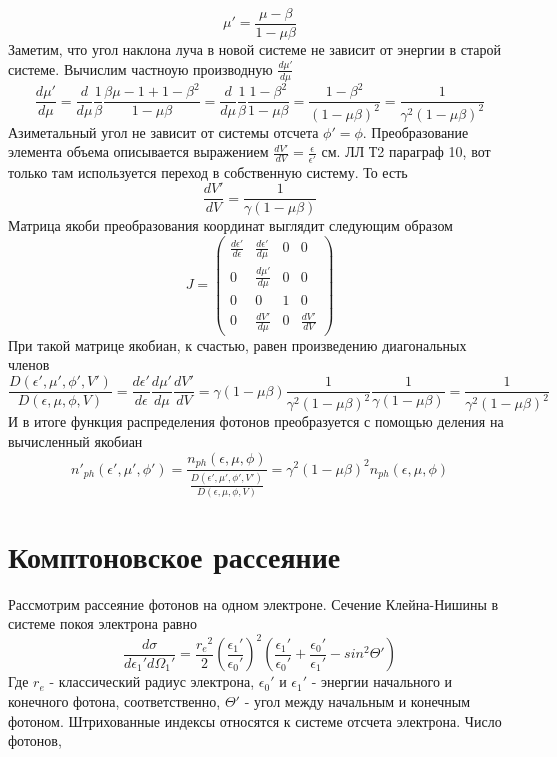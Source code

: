 \begin{equation}\label{aberration_ph}
	\mu'=\frac{\mu-\beta}{1-\mu\beta}
\end{equation}
Заметим, что угол наклона луча в новой системе не зависит от энергии в старой системе. Вычислим частноую производную $\frac{d\mu'}{d\mu}$
\begin{equation}
	\frac{d\mu'}{d\mu}=\frac{d}{d\mu}\frac{1}{\beta}\frac{\beta\mu-1+1-\beta^2}{1-\mu\beta}=\frac{d}{d\mu}\frac{1}{\beta}\frac{1-\beta^2}{1-\mu\beta}=\frac{1-\beta^2}{(1-\mu\beta)^2}=\frac{1}{\gamma^2(1-\mu\beta)^2}
\end{equation}
Азиметальный угол не зависит от системы отсчета $\phi' = \phi$. Преобразование элемента объема описывается выражением $\frac{dV'}{dV} = \frac{\epsilon}{\epsilon'}$ см. ЛЛ Т2 параграф 10, вот только там используется переход в собственную систему. То есть
\begin{equation}
	\frac{dV'}{dV} = \frac{1}{\gamma(1-\mu\beta)}
\end{equation}
Матрица якоби преобразования координат выглядит следующим образом
\begin{equation}
	J=\left(
	\begin{array}{cccc}
		\frac{d\epsilon'}{d\epsilon} & \frac{d\epsilon'}{d\mu}& 0 & 0\\
		0 & \frac{d\mu'}{d\mu} & 0 & 0\\
		0 & 0 & 1 & 0\\
		0 & \frac{dV'}{d\mu} & 0 & \frac{dV'}{dV}
	\end{array}
	\right)
\end{equation}
При такой матрице якобиан, к счастью, равен произведению диагональных членов
\begin{equation}\label{jacobian_ph}
	\frac{D(\epsilon',\mu',\phi',V')}{D(\epsilon,\mu,\phi,V)}=\frac{d\epsilon'}{d\epsilon}\frac{d\mu'}{d\mu}\frac{dV'}{dV}=\gamma(1-\mu\beta)\frac{1}{\gamma^2(1-\mu\beta)^2}\frac{1}{\gamma(1-\mu\beta)}=\frac{1}{\gamma^2(1-\mu\beta)^2}
\end{equation}
И в итоге функция распределения фотонов преобразуется с помощью деления на вычисленный якобиан
\begin{equation}\label{distribution_ph}
	n'_{ph}(\epsilon',\mu',\phi') = \frac{n_{ph}(\epsilon,\mu,\phi)}{\frac{D(\epsilon',\mu',\phi',V')}{D(\epsilon,\mu,\phi,V)}}=\gamma^2(1-\mu\beta)^2 n_{ph}(\epsilon,\mu,\phi)
\end{equation}
\section{Комптоновское рассеяние}
Рассмотрим рассеяние фотонов на одном электроне. Сечение Клейна-Нишины в системе покоя электрона равно
\begin{equation}
	\frac{d\sigma}{d\epsilon_1'd\Omega_1'}=\frac{{r_e}^2}{2}\left(\frac{\epsilon_1'}{\epsilon_0'}\right)^2\left(\frac{\epsilon_1'}{\epsilon_0'}+\frac{\epsilon_0'}{\epsilon_1'}-sin^2\Theta'\right)
\end{equation}
Где $r_e$ - классический радиус электрона, $\epsilon_0'$ и $\epsilon_1'$ - энергии начального и конечного фотона, соответственно, $\Theta'$ - угол между начальным и конечным фотоном. Штрихованные индексы относятся к системе отсчета электрона.
Число фотонов, 


